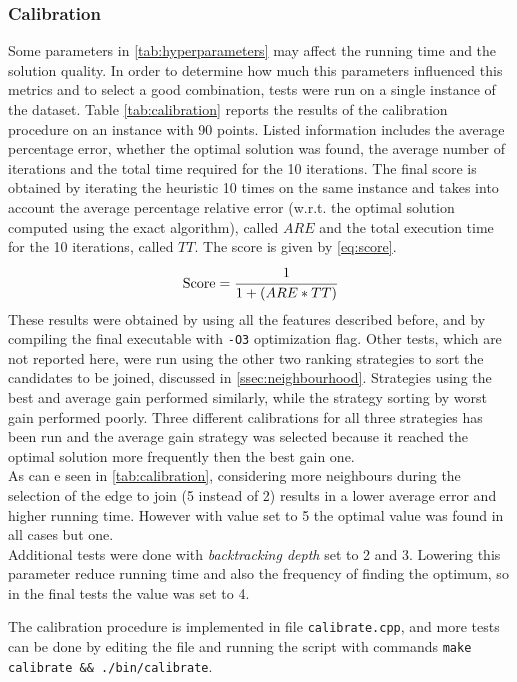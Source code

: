 \subsubsection{Calibration}
Some parameters in \cref{tab:hyperparameters} may affect the running time and the solution quality. In order to determine how much this parameters influenced this metrics and to select a good combination, tests were run on a single instance of the dataset. Table \ref{tab:calibration} reports the results of the calibration procedure on an instance with 90 points. Listed information includes the average percentage error, whether the optimal solution was found, the average number of iterations and the total time required for the 10 iterations.
The final score is obtained by iterating the heuristic 10 times on the same instance and takes into account the average percentage relative error (w.r.t. the optimal solution computed using the exact algorithm), called $ARE$ and the total execution time for the 10 iterations, called $TT$. The score is given by \cref{eq:score}.
\begin{equation}
	\text{Score} = \cfrac{1}{1 + (ARE * TT)}
	\label{eq:score}
\end{equation}
These results were obtained by using all the features described before, and by compiling the final executable with \texttt{-O3} optimization flag.
Other tests, which are not reported here, were run using the other two ranking strategies to sort the candidates to be joined, discussed in \cref{ssec:neighbourhood}. Strategies using the best and average gain performed similarly, while the strategy sorting by worst gain performed poorly. Three different calibrations for all three strategies has been run and the average gain strategy was selected because it reached the optimal solution more frequently then the best gain one.\\
As can e seen in \cref{tab:calibration}, considering more neighbours during the selection of the edge to join (5 instead of 2) results in a lower average error and higher running time. However with value set to 5 the optimal value was found in all cases but one.\\
Additional tests were done with \textit{backtracking depth} set to 2 and 3. Lowering this parameter reduce running time and also the frequency of finding the optimum, so in the final tests the value was set to 4.\\


The calibration procedure is implemented in file \texttt{calibrate.cpp}, and more tests can be done by editing the file and running the script with commands \texttt{make calibrate \&\& ./bin/calibrate}.

